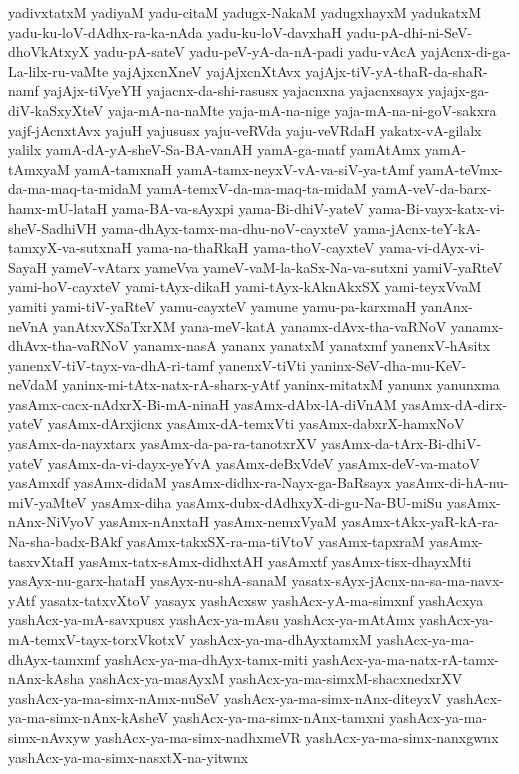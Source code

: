 {yadivxtatxM
yadiyaM
yadu-citaM
yadugx-NakaM
yadugxhayxM
yadukatxM
yadu-ku-loV-dAdhx-ra-ka-nAda
yadu-ku-loV-davxhaH
yadu-pA-dhi-ni-SeV-dhoVkAtxyX
yadu-pA-sateV
yadu-peV-yA-da-nA-padi
yadu-vAcA
yajAcnx-di-ga-La-lilx-ru-vaMte
yajAjxcnXneV
yajAjxcnXtAvx
yajAjx-tiV-yA-thaR-da-shaR-namf
yajAjx-tiVyeYH
yajacnx-da-shi-rasusx
yajacnxna
yajacnxsayx
yajajx-ga-diV-kaSxyXteV
yaja-mA-na-naMte
yaja-mA-na-nige
yaja-mA-na-ni-goV-sakxra
yajf-jAcnxtAvx
yajuH
yajususx
yaju-veRVda
yaju-veVRdaH
yakatx-vA-gilalx
yalilx
yamA-dA-yA-sheV-Sa-BA-vanAH
yamA-ga-matf
yamAtAmx
yamA-tAmxyaM
yamA-tamxnaH
yamA-tamx-neyxV-vA-va-siV-ya-tAmf
yamA-teVmx-da-ma-maq-ta-midaM
yamA-temxV-da-ma-maq-ta-midaM
yamA-veV-da-barx-hamx-mU-lataH
yama-BA-va-sAyxpi
yama-Bi-dhiV-yateV
yama-Bi-vayx-katx-vi-sheV-SadhiVH
yama-dhAyx-tamx-ma-dhu-noV-cayxteV
yama-jAcnx-teY-kA-tamxyX-va-sutxnaH
yama-na-thaRkaH
yama-thoV-cayxteV
yama-vi-dAyx-vi-SayaH
yameV-vAtarx
yameVva
yameV-vaM-la-kaSx-Na-va-sutxni
yamiV-yaRteV
yami-hoV-cayxteV
yami-tAyx-dikaH
yami-tAyx-kAknAkxSX
yami-teyxVvaM
yamiti
yami-tiV-yaRteV
yamu-cayxteV
yamune
yamu-pa-karxmaH
yanAnx-neVnA
yanAtxvXSaTxrXM
yana-meV-katA
yanamx-dAvx-tha-vaRNoV
yanamx-dhAvx-tha-vaRNoV
yanamx-nasA
yananx
yanatxM
yanatxmf
yanenxV-hAsitx
yanenxV-tiV-tayx-va-dhA-ri-tamf
yanenxV-tiVti
yaninx-SeV-dha-mu-KeV-neVdaM
yaninx-mi-tAtx-natx-rA-sharx-yAtf
yaninx-mitatxM
yanunx
yanunxma
yasAmx-cacx-nAdxrX-Bi-mA-ninaH
yasAmx-dAbx-lA-diVnAM
yasAmx-dA-dirx-yateV
yasAmx-dArxjicnx
yasAmx-dA-temxVti
yasAmx-dabxrX-hamxNoV
yasAmx-da-nayxtarx
yasAmx-da-pa-ra-tanotxrXV
yasAmx-da-tArx-Bi-dhiV-yateV
yasAmx-da-vi-dayx-yeYvA
yasAmx-deBxVdeV
yasAmx-deV-va-matoV
yasAmxdf
yasAmx-didaM
yasAmx-didhx-ra-Nayx-ga-BaRsayx
yasAmx-di-hA-nu-miV-yaMteV
yasAmx-diha
yasAmx-dubx-dAdhxyX-di-gu-Na-BU-miSu
yasAmx-nAnx-NiVyoV
yasAmx-nAnxtaH
yasAmx-nemxVyaM
yasAmx-tAkx-yaR-kA-ra-Na-sha-badx-BAkf
yasAmx-takxSX-ra-ma-tiVtoV
yasAmx-tapxraM
yasAmx-tasxvXtaH
yasAmx-tatx-sAmx-didhxtAH
yasAmxtf
yasAmx-tisx-dhayxMti
yasAyx-nu-garx-hataH
yasAyx-nu-shA-sanaM
yasatx-sAyx-jAcnx-na-sa-ma-navx-yAtf
yasatx-tatxvXtoV
yasayx
yashAcxsw
yashAcx-yA-ma-simxnf
yashAcxya
yashAcx-ya-mA-savxpusx
yashAcx-ya-mAsu
yashAcx-ya-mAtAmx
yashAcx-ya-mA-temxV-tayx-torxVkotxV
yashAcx-ya-ma-dhAyxtamxM
yashAcx-ya-ma-dhAyx-tamxmf
yashAcx-ya-ma-dhAyx-tamx-miti
yashAcx-ya-ma-natx-rA-tamx-nAnx-kAsha
yashAcx-ya-masAyxM
yashAcx-ya-ma-simxM-shacxnedxrXV
yashAcx-ya-ma-simx-nAmx-nuSeV
yashAcx-ya-ma-simx-nAnx-diteyxV
yashAcx-ya-ma-simx-nAnx-kAsheV
yashAcx-ya-ma-simx-nAnx-tamxni
yashAcx-ya-ma-simx-nAvxyw
yashAcx-ya-ma-simx-nadhxmeVR
yashAcx-ya-ma-simx-nanxgwnx
yashAcx-ya-ma-simx-nasxtX-na-yitwnx
}
